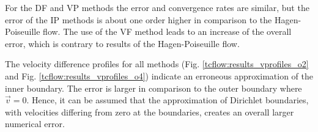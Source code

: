 For the DF and VP methods the error and convergence rates are similar,
but the error of the IP methods is about one order higher in comparison to the Hagen-Poiseuille flow.
The use of the VF method leads to an increase of the overall error, which is contrary to results of the Hagen-Poiseuille flow.

The velocity difference profiles for all methods (Fig. \ref{tcflow:results_vprofiles_o2} and Fig. \ref{tcflow:results_vprofiles_o4})
indicate an erroneous approximation of the inner boundary.
The error is larger in comparison to the outer boundary where $\vec{v} = 0$.
Hence, it can be assumed that the approximation of Dirichlet boundaries, with velocities differing from zero at the boundaries,
creates an overall larger numerical error.






%
%

